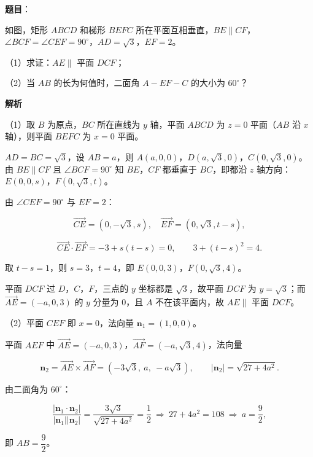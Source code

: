 \begin{answer}

\textbf{题目}：

如图，矩形 $ABCD$ 和梯形 $BEFC$ 所在平面互相垂直，$BE\parallel CF$，$\angle BCF=\angle CEF=90^\circ$，$AD=\sqrt3$，$EF=2$。

（1）求证：$AE\parallel$ 平面 $DCF$；

（2）当 $AB$ 的长为何值时，二面角 $A-EF-C$ 的大小为 $60^\circ$？
\nopagebreak[4]
\begin{center}\end{center}
\nopagebreak[4]
\textbf{解析}

（1）取 $B$ 为原点，$BC$ 所在直线为 $y$ 轴，平面 $ABCD$ 为 $z=0$ 平面（$AB$ 沿 $x$ 轴），则平面 $BEFC$ 为 $x=0$ 平面。

$AD=BC=\sqrt3$，设 $AB=a$，则 $A(a,0,0)$，$D(a,\sqrt3,0)$，$C(0,\sqrt3,0)$。由 $BE\parallel CF$ 且 $\angle BCF=90^\circ$ 知 $BE$，$CF$ 都垂直于 $BC$，即都沿 $z$ 轴方向：$E(0,0,s)$，$F(0,\sqrt3,t)$。

由 $\angle CEF=90^\circ$ 与 $EF=2$：

\nopagebreak[4]
\[\overrightarrow{CE}=(0,-\sqrt3,s),\quad \overrightarrow{EF}=(0,\sqrt3,t-s),\]

\nopagebreak[4]
\[\overrightarrow{CE}\cdot\overrightarrow{EF}=-3+s(t-s)=0,\qquad 3+(t-s)^2=4.\]

取 $t-s=1$，则 $s=3$，$t=4$，即 $E(0,0,3)$，$F(0,\sqrt3,4)$。

平面 $DCF$ 过 $D$，$C$，$F$，三点的 $y$ 坐标都是 $\sqrt3$，故平面 $DCF$ 为 $y=\sqrt3$；而 $\overrightarrow{AE}=(-a,0,3)$ 的 $y$ 分量为 $0$，且 $A$ 不在该平面内，故 $AE\parallel$ 平面 $DCF$。

（2）平面 $CEF$ 即 $x=0$，法向量 $\boldsymbol n_1=(1,0,0)$。

平面 $AEF$ 中 $\overrightarrow{AE}=(-a,0,3)$，$\overrightarrow{AF}=(-a,\sqrt3,4)$，法向量

\nopagebreak[4]
\[\boldsymbol n_2=\overrightarrow{AE}\times\overrightarrow{AF}=\left(-3\sqrt3,\ a,\ -a\sqrt3\right),\qquad |\boldsymbol n_2|=\sqrt{27+4a^2}.\]

由二面角为 $60^\circ$：

\nopagebreak[4]
\[\frac{\left|\boldsymbol n_1\cdot\boldsymbol n_2\right|}{|\boldsymbol n_1||\boldsymbol n_2|}=\frac{3\sqrt3}{\sqrt{27+4a^2}}=\frac12\ \Longrightarrow\ 27+4a^2=108\ \Longrightarrow\ a=\frac92,\]

即 $AB=\dfrac92$。


\end{answer}
